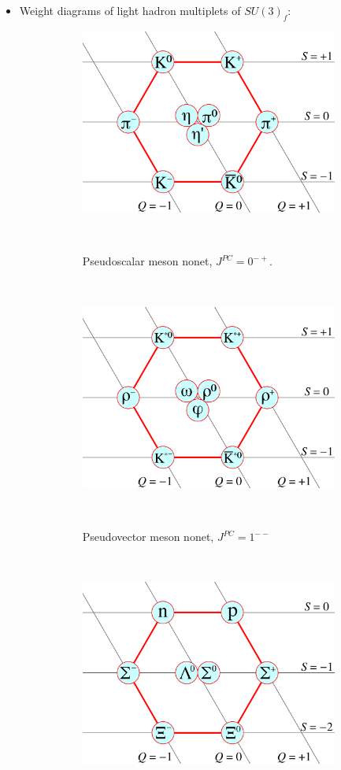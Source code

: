 \documentclass[11pt, oneside]{article}   	%
\theoremstyle{definition}
\numberwithin{equation}{subsection}		%
\begin{document}
\begin{itemize}
	\item Weight diagrams of light hadron multiplets of $SU(3)_f$:
	\begin{figure}[H]
	\centering
	\begin{subfigure}[t]{.38\textwidth}
		\centering
		\includegraphics[width = .8\textwidth]{scalar_meson_nonet}
		\caption{Pseudoscalar meson nonet, $J^{PC} = 0^{-+}$.}~
	\end{subfigure}
	~
	\begin{subfigure}[t]{.38\textwidth}
		\centering
		\includegraphics[width = .8\textwidth]{vector_meson_nonet}
		\caption{Pseudovector meson nonet, $J^{PC} = 1^{--}$}~
	\end{subfigure}
	\\
		\begin{subfigure}[t]{.38\textwidth}
		\centering
		\includegraphics[width = .8\textwidth]{baryon_octet}

\end{subfigure}
\end{figure}
\end{itemize}
\end{document}
